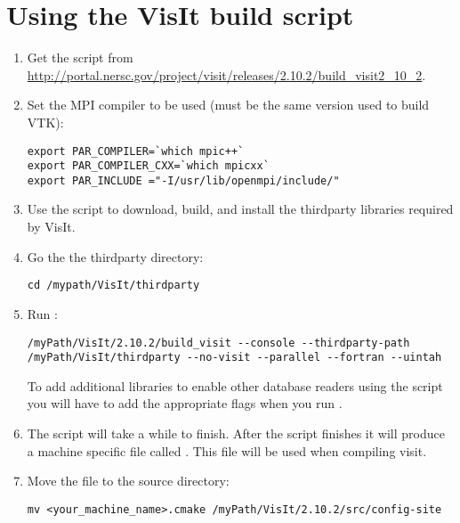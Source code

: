 \documentclass[11pt,fleqn]{book} %
\begin{document}
\section{Using the VisIt build script}
\begin{enumerate}
  \item Get the  script from \url{http://portal.nersc.gov/project/visit/releases/2.10.2/build_visit2_10_2}.

  \item Set the MPI compiler to be used (must be the same version used to build VTK):
\begin{lstlisting}[backgroundcolor=\color{background}]
export PAR_COMPILER=`which mpic++` 
export PAR_COMPILER_CXX=`which mpicxx` 
export PAR_INCLUDE ="-I/usr/lib/openmpi/include/"
\end{lstlisting}

  \item Use the  script to download, build, and install the thirdparty 
        libraries required by VisIt. 

  \item Go the the \Visit thirdparty directory:
\begin{lstlisting}[backgroundcolor=\color{background}]
cd /mypath/VisIt/thirdparty
\end{lstlisting}

  \item Run :
\begin{lstlisting}[backgroundcolor=\color{background}]
/myPath/VisIt/2.10.2/build_visit --console --thirdparty-path /myPath/VisIt/thirdparty --no-visit --parallel --fortran --uintah
\end{lstlisting}
       \begin{NoteBox}
       To add additional libraries to enable other database readers using the  script 
       you will have to add the appropriate flags when you run .
       \end{NoteBox}

  \item The  script will take a while to finish.  After the script finishes it 
        will produce a machine specific  file called 
        . This file will be used when 
        compiling visit. 

  \item Move the  file
        to the \Visit source  directory:
\begin{lstlisting}[backgroundcolor=\color{background}]
mv <your_machine_name>.cmake /myPath/VisIt/2.10.2/src/config-site
\end{lstlisting}


\end{enumerate}
\end{document}
